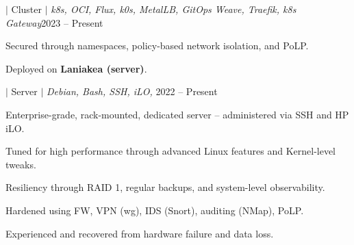 \documentclass[a4paper,11pt]{article}
\begin{document}
\begin{sectionList}
\begin{project}{\textbf{\laniakea} $|$ Cluster $|$ \textit{k8s,
        OCI, Flux, k0s, MetalLB, GitOps Weave, Traefik, k8s
    Gateway}}{2023 -- Present}
  \item Secured through namespaces, policy-based network isolation, and PoLP.
  \item Deployed on \textbf{Laniakea (server)}.
  \end{project}
  \begin{project}{\textbf{\laniakea} $|$ Server $|$ \textit{Debian,
    Bash, SSH, iLO, }}{2022 -- Present}
  \item Enterprise-grade, rack-mounted, dedicated server --
    administered via SSH and HP iLO.
  \item Tuned for high performance through advanced Linux features
    and Kernel-level tweaks.
  \item Resiliency through RAID 1, regular backups, and system-level
    observability.
  \item Hardened using FW, VPN (wg), IDS (Snort), auditing (NMap), PoLP.
  \item Experienced and recovered from hardware failure and data loss.
  \end{project}
\end{sectionList}
\end{document}
